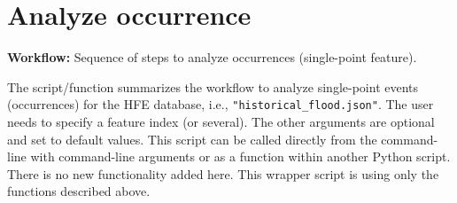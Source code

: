 \documentclass[10pt,a4paper,titlepage,parskip]{scrartcl}
\begin{document}
\section{Analyze occurrence}

\textbf{Workflow:} Sequence of steps to analyze occurrences (single-point feature).

The script/function summarizes the workflow to analyze single-point events (occurrences) for the HFE database, i.e.,
\texttt{"historical\_flood.json"}. The user needs to specify a feature index (or several). The other arguments are optional and
set to default values. This script can be called directly from the command-line with command-line arguments or as a function within another Python script. There is no new functionality added here. This wrapper script is using only the functions described above.
\end{document}
